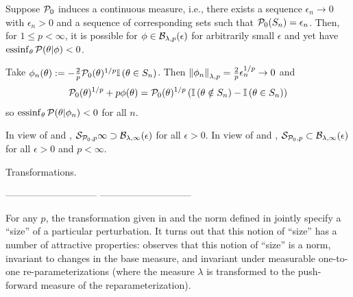 \begin{ex}
%
Suppose $\mathcal{P}_{0}$ induces a continuous measure, i.e., there exists a sequence
$\epsilon_n \rightarrow 0$ with $\epsilon_n > 0$ and a sequence of corresponding
sets such that $\mathcal{P}_{0}(S_n) = \epsilon_n$.  Then, for $1 \le p < \infty$, it is
possible for $\phi \in \mathcal{B}_{\lambda,p}(\epsilon)$ for arbitrarily small
$\epsilon$ and yet have $\operatorname*{\mathrm{essinf}}_{\theta} \mathcal{P}(\theta \vert \phi) < 0$.

Take
%
%
$\phi_n(\theta) := - \frac{2}{p} \mathcal{P}_{0}(\theta)^{1/p} \mathbb{I}\left(\theta \in S_n\right)$.
%
%
Then $\left\Vert\phi_n\right\Vert_{\lambda, p} = \frac{2}{p} \epsilon_n^{1/p} \rightarrow 0$
and
%
\begin{align*}
%
\pbase(\theta)^{1/p} + p \phi(\theta) ={}
\pbase(\theta)^{1/p}
\left(\ind{\theta \notin S_n} - \ind{\theta \in S_n} \right)
%
\end{align*}
%
so $\operatorname*{\mathrm{essinf}}_\theta \mathcal{P}(\theta \vert \phi_n) < 0$ for all $n$.
%
\end{ex}

In view of  and ,
$\mathcal{S}_{\mathcal{P}_{0},p}{\infty} \supset \mathcal{B}_{\lambda,\infty}(\epsilon)$ for all $\epsilon >
0$. In view of  and , $\mathcal{S}_{\mathcal{P}_{0},p}
\subset \mathcal{B}_{\lambda,\infty}(\epsilon)$ for all $\epsilon > 0$ and $p <
\infty$.


\begin{ex}
%
Transformations.
%
\end{ex}

-----------------------------
-----------------------------


For any $p$, the transformation given in  and the norm
defined in  jointly specify a ``size'' of a particular
perturbation.   It turns out that this notion of ``size'' has a number of
attractive properties: \citep[Result 2]{gustafson:1996:local} observes that this
notion of ``size'' is a norm, invariant to changes in the base measure, and
invariant under measurable one-to-one re-parameterizations (where the measure
$\lambda$ is transformed to the push-forward measure of the reparameterization).

